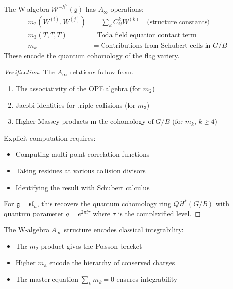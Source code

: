 \begin{theorem}
The W-algebra $\mathcal{W}^{-h^\vee}(\mathfrak{g})$ has $A_\infty$ operations:
\begin{align}
m_2(W^{(i)}, W^{(j)}) &= \sum_{k} C^k_{ij} W^{(k)} \quad \text{(structure constants)} \\
m_3(T, T, T) &= \text{Toda field equation contact term} \\
m_k &= \text{Contributions from Schubert cells in } G/B
\end{align}
These encode the quantum cohomology of the flag variety.
\end{theorem}
 
\begin{proof}[Verification]
The $A_\infty$ relations follow from:
\begin{enumerate}
\item The associativity of the OPE algebra (for $m_2$)
\item Jacobi identities for triple collisions (for $m_3$)  
\item Higher Massey products in the cohomology of $G/B$ (for $m_k$, $k \geq 4$)
\end{enumerate}
 
Explicit computation requires:
\begin{itemize}
\item Computing multi-point correlation functions
\item Taking residues at various collision divisors
\item Identifying the result with Schubert calculus
\end{itemize}
 
For $\mathfrak{g} = \mathfrak{sl}_n$, this recovers the quantum cohomology ring $QH^*(G/B)$ with quantum 
parameter $q = e^{2\pi i \tau}$ where $\tau$ is the complexified level.
\end{proof}
 
\begin{corollary}[Integrability]
The W-algebra $A_\infty$ structure encodes classical integrability:
\begin{itemize}
\item The $m_2$ product gives the Poisson bracket
\item Higher $m_k$ encode the hierarchy of conserved charges
\item The master equation $\sum_k m_k = 0$ ensures integrability
\end{itemize}
\end{corollary}

